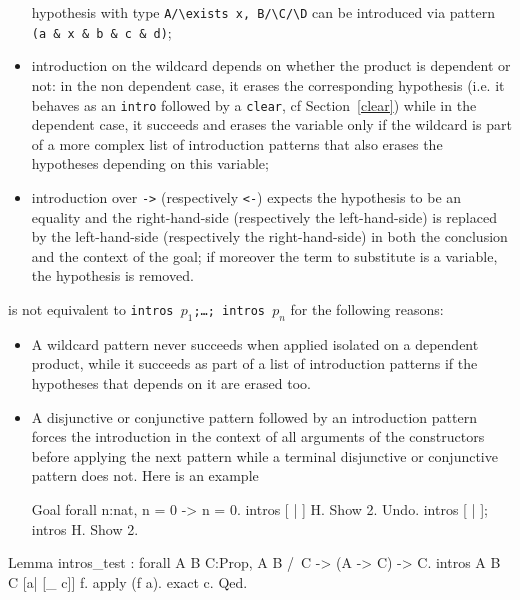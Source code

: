 \begin{itemize}
  hypothesis with type {\tt A\verb|/\|exists x, B\verb|/\|C\verb|/\|D} can be
  introduced via pattern {\tt (a \& x \& b \& c \& d)};
\item introduction on the wildcard depends on whether the product is
  dependent or not: in the non dependent case, it erases the
  corresponding hypothesis (i.e. it behaves as an {\tt intro} followed
  by a {\tt clear}, cf Section~\ref{clear}) while in the dependent
  case, it succeeds and erases the variable only if the wildcard is
  part of a more complex list of introduction patterns that also
  erases the hypotheses depending on this variable;
\item introduction over {\tt ->} (respectively {\tt <-}) expects the
  hypothesis to be an equality and the right-hand-side (respectively
  the left-hand-side) is replaced by the left-hand-side (respectively
  the right-hand-side) in both the conclusion and the context of the goal;
  if moreover the term to substitute is a variable, the hypothesis is
  removed.
\end{itemize}

 is not equivalent to \texttt{intros
  $p_1$;\ldots; intros $p_n$} for the following reasons:
\begin{itemize}
\item A wildcard pattern never succeeds when applied isolated on a
  dependent product, while it succeeds as part of a list of
  introduction patterns if the hypotheses that depends on it are
  erased too.
\item A disjunctive or conjunctive pattern followed by an introduction
  pattern forces the introduction in the context of all arguments of
  the constructors before applying the next pattern while a terminal
  disjunctive or conjunctive pattern does not. Here is an example

\begin{coq_example}
Goal forall n:nat, n = 0 -> n = 0.
intros [ | ] H.
Show 2.
Undo.
intros [ | ]; intros H.
Show 2.
\end{coq_example}

\end{itemize}

\begin{coq_example}
Lemma intros_test : forall A B C:Prop, A \/ B /\ C -> (A -> C) -> C.
intros A B C [a| [_ c]] f.
apply (f a).
exact c.
Qed.
\end{coq_example}


